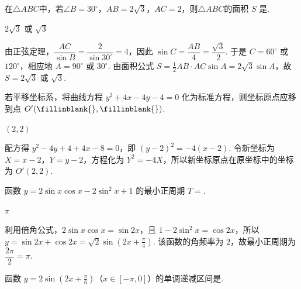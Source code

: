 \begin{problem}
在\(\triangle ABC\)中，若\(\angle B=30^{\circ}\)，\(AB=2\sqrt{3}\)，\(AC=2\)，则\(\triangle ABC\)的面积 \(S\) 是\fillinblank{}.
\end{problem}

\begin{answer}
\(2\sqrt{3}\) 或 \(\sqrt{3}\)
\end{answer}

\begin{solution}
由正弦定理，\(\dfrac{AC}{\sin B}=\dfrac{2}{\sin30^{\circ}}=4\)，因此 \(\sin C=\dfrac{AB}{4}=\dfrac{\sqrt{3}}{2}\). 于是 \(C=60^{\circ}\) 或 \(120^{\circ}\)，相应地 \(A=90^{\circ}\) 或 \(30^{\circ}\). 由面积公式
\(S=\frac12 AB\cdot AC\sin A=2\sqrt{3}\sin A\)，故 \(S=2\sqrt{3}\) 或 \(\sqrt{3}\).
\end{solution}

\begin{problem}
若平移坐标系，将曲线方程 \(y^{2} + 4x - 4y - 4 = 0 \) 化为标准方程，则坐标原点应移到点 \(O'(\fillinblank{},\fillinblank{}) \).
\end{problem}

\begin{answer}
\((2,2)\)
\end{answer}

\begin{solution}
配方得 \(y^{2}-4y+4+4x-8=0\)，即 \((y-2)^{2}=-4(x-2)\). 令新坐标为 \(X=x-2\)，\(Y=y-2\)，方程化为 \(Y^{2}=-4X\)，所以新坐标原点在原坐标中的坐标为 \(O'(2,2)\).
\end{solution}

\begin{problem}
函数 \(y = 2\sin x \cos x - 2\sin^{2}x + 1 \) 的最小正周期 \(T=\)\fillinblank{}.
\end{problem}

\begin{answer}
\(\pi\)
\end{answer}

\begin{solution}
利用倍角公式，\(2\sin x\cos x=\sin2x\)，且 \(1-2\sin^{2}x=\cos2x\)，所以 \(y=\sin2x+\cos2x=\sqrt2\sin\left(2x+\frac{\pi}{4}\right)\). 该函数的角频率为 \(2\)，故最小正周期为 \(\dfrac{2\pi}{2}=\pi\).
\end{solution}

\begin{problem}
函数 \(y = 2\sin(2x + \frac{\pi}{6})\)（\(x \in [-\pi, 0]\)）的单调递减区间是\fillinblank{}.
\end{problem}

